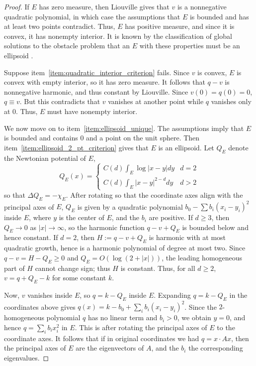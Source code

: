 \documentclass[11pt]{amsart}
\numberwithin{equation}{section}
\numberwithin{figure}{section}
\theoremstyle{plain}
\theoremstyle{definition}
\theoremstyle{remark}
\theoremstyle{plain}
\begin{document}
\begin{proof}

If $E$ has zero measure, then Liouville gives that $v$ is a nonnegative quadratic polynomial, in which case the assumptions that $E$ is bounded and has at least two points contradict. Thus, $E$ has positive measure, and since it is convex, it has nonempty interior. It is known by the classification of global solutions to the obstacle problem that an $E$ with these properties must be an ellipsoid \cite{FriedmanSakai1986, EFW25}.

Suppose item~\ref{item:quadratic_interior_criterion} fails. Since $v$ is convex, $E$ is convex with empty interior, so it has zero measure. It follows that $q - v$ is nonnegative harmonic, and thus constant by Liouville. Since $v(0) = q(0) = 0$, $q\equiv v$. But this contradicts that $v$ vanishes at another point while $q$ vanishes only at 0. Thus, $E$ must have nonempty interior.

We now move on to item~\ref{item:ellipsoid_unique}. The assumptions imply that $E$ is bounded and contains 0 and a point on the unit sphere. Then item~\ref{item:ellipsoid_2_pt_criterion} gives that $E$ is an ellipsoid. Let $Q_E$ denote the Newtonian potential of $E$,
\[ Q_E(x) = \begin{cases}
    C(d)\int_E \log |x-y|dy & d=2\\ C(d)\int_E |x-y|^{2-d}dy & d>2
\end{cases}   \]
    so that $\Delta Q_E = -\chi_E$. After rotating so that the coordinate axes align with the principal axes of $E$, $Q_E$ is given by a quadratic polynomial $b_0 - \sum b_i(x_i-y_i)^2$ inside $E$, where $y$ is the center of $E$, and the $b_i$ are positive. If $d\geq 3$, then $Q_E\to 0$ as $|x|\to\infty$, so the harmonic function $q-v+Q_E$ is bounded below and hence constant. If $d=2$, then $H:=q-v+Q_E$ is harmonic with at most quadratic growth, hence is a harmonic polynomial of degree at most two. Since $q-v=H-Q_E\geq0$ and $Q_E=O(\log(2+|x|))$, the leading homogeneous part of $H$ cannot change sign; thus $H$ is constant. Thus, for all $d\geq 2$, $v=q+Q_E-k$ for some constant $k$.

    Now, $v$ vanishes inside $E$, so $q = k-Q_E$ inside $E$. Expanding $q=k-Q_E$ in the coordinates above gives $q(x)=k-b_0+\sum_i b_i(x_i-y_i)^2$. Since the $2$-homogeneous polynomial $q$ has no linear term and $b_i>0$, we obtain $y=0$, and hence $q=\sum_i b_i x_i^2$ in $E$. This is after rotating the principal axes of $E$ to the coordinate axes. It follows that if in original coordinates we had $q = x\cdot Ax$, then the principal axes of $E$ are the eigenvectors of $A$, and the $b_i$ the corresponding eigenvalues.
    

\end{proof}
\end{document}
